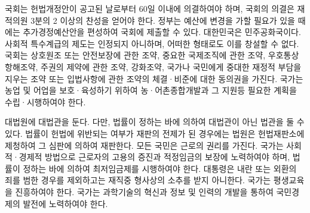 \documentclass[master, korean]{pnuthesis}
\begin{document}
%
%
\printbibliography[title=Reference]




\pagebreak
\acknowledgement %

국회는 헌법개정안이 공고된 날로부터 60일 이내에 의결하여야 하며, 국회의 의결은 재적의원 3분의 2 이상의 찬성을 얻어야 한다. 정부는 예산에 변경을 가할 필요가 있을 때에는 추가경정예산안을 편성하여 국회에 제출할 수 있다. 대한민국은 민주공화국이다. 사회적 특수계급의 제도는 인정되지 아니하며, 어떠한 형태로도 이를 창설할 수 없다. 국회는 상호원조 또는 안전보장에 관한 조약, 중요한 국제조직에 관한 조약, 우호통상항해조약, 주권의 제약에 관한 조약, 강화조약, 국가나 국민에게 중대한 재정적 부담을 지우는 조약 또는 입법사항에 관한 조약의 체결·비준에 대한 동의권을 가진다. 국가는 농업 및 어업을 보호·육성하기 위하여 농·어촌종합개발과 그 지원등 필요한 계획을 수립·시행하여야 한다.

대법원에 대법관을 둔다. 다만, 법률이 정하는 바에 의하여 대법관이 아닌 법관을 둘 수 있다. 법률이 헌법에 위반되는 여부가 재판의 전제가 된 경우에는 법원은 헌법재판소에 제청하여 그 심판에 의하여 재판한다. 모든 국민은 근로의 권리를 가진다. 국가는 사회적·경제적 방법으로 근로자의 고용의 증진과 적정임금의 보장에 노력하여야 하며, 법률이 정하는 바에 의하여 최저임금제를 시행하여야 한다. 대통령은 내란 또는 외환의 죄를 범한 경우를 제외하고는 재직중 형사상의 소추를 받지 아니한다. 국가는 평생교육을 진흥하여야 한다. 국가는 과학기술의 혁신과 정보 및 인력의 개발을 통하여 국민경제의 발전에 노력하여야 한다.
\end{document}

